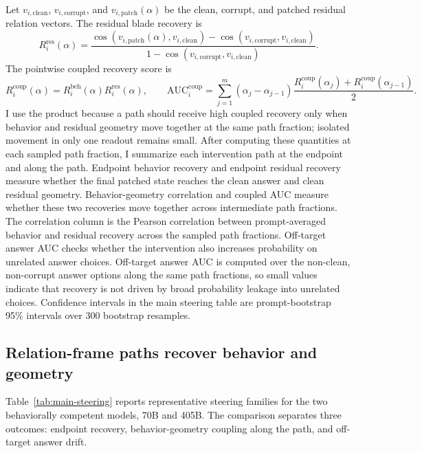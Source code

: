 \documentclass[11pt]{article}
\newcommand{\clean}{\mathrm{clean}}
\newcommand{\corr}{\mathrm{corrupt}}
\newcommand{\patch}{\mathrm{patch}}
\begin{document}
Let $v_{i,\clean}$, $v_{i,\corr}$, and $v_{i,\patch}(\alpha)$ be the clean, corrupt, and patched residual relation vectors. The residual blade recovery is
\begin{equation}
R^{\mathrm{res}}_i(\alpha)=\frac{\cos(v_{i,\patch}(\alpha),v_{i,\clean})-\cos(v_{i,\corr},v_{i,\clean})}{1-\cos(v_{i,\corr},v_{i,\clean})}.
\end{equation}
The pointwise coupled recovery score is
\begin{equation}
R^{\mathrm{coup}}_i(\alpha)=R^{\mathrm{beh}}_i(\alpha)R^{\mathrm{res}}_i(\alpha),
\qquad
\mathrm{AUC}^{\mathrm{coup}}_i
=\sum_{j=1}^{m}(\alpha_j-\alpha_{j-1})
\frac{R^{\mathrm{coup}}_i(\alpha_j)+R^{\mathrm{coup}}_i(\alpha_{j-1})}{2}.
\end{equation}
I use the product because a path should receive high coupled recovery only when behavior and residual geometry move together at the same path fraction; isolated movement in only one readout remains small. After computing these quantities at each sampled path fraction, I summarize each intervention path at the endpoint and along the path. Endpoint behavior recovery and endpoint residual recovery measure whether the final patched state reaches the clean answer and clean residual geometry. Behavior-geometry correlation and coupled AUC measure whether these two recoveries move together across intermediate path fractions. The correlation column is the Pearson correlation between prompt-averaged behavior and residual recovery across the sampled path fractions. Off-target answer AUC checks whether the intervention also increases probability on unrelated answer choices. Off-target answer AUC is computed over the non-clean, non-corrupt answer options along the same path fractions, so small values indicate that recovery is not driven by broad probability leakage into unrelated choices. Confidence intervals in the main steering table are prompt-bootstrap 95\% intervals over 300 bootstrap resamples.

\subsection{Relation-frame paths recover behavior and geometry}

Table~\ref{tab:main-steering} reports representative steering families for the two behaviorally competent models, 70B and 405B. The comparison separates three outcomes: endpoint recovery, behavior-geometry coupling along the path, and off-target answer drift.
\end{document}
